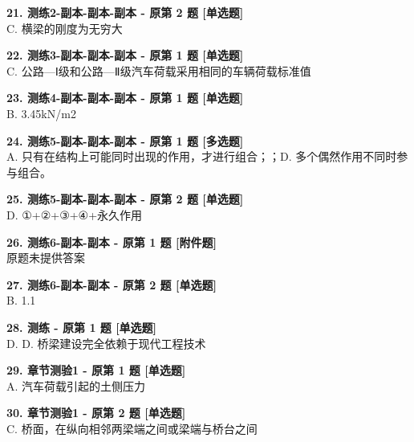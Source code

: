 \documentclass[UTF8,zihao=-4,openany]{ctexbook}
\begin{document}
\begin{answerline}
\textbf{21. 测练2-副本-副本-副本 - 原第 2 题 [单选题]}\\
C. 横梁的刚度为无穷大
\end{answerline}

\begin{answerline}
\textbf{22. 测练3-副本-副本-副本 - 原第 1 题 [单选题]}\\
C. 公路—Ⅰ级和公路—Ⅱ级汽车荷载采用相同的车辆荷载标准值
\end{answerline}

\begin{answerline}
\textbf{23. 测练4-副本-副本-副本 - 原第 1 题 [单选题]}\\
B. 3.45kN/m2
\end{answerline}

\begin{answerline}
\textbf{24. 测练5-副本-副本-副本 - 原第 1 题 [多选题]}\\
A. 只有在结构上可能同时出现的作用，才进行组合；；D. 多个偶然作用不同时参与组合。
\end{answerline}

\begin{answerline}
\textbf{25. 测练5-副本-副本-副本 - 原第 2 题 [单选题]}\\
D. ①+②+③+④+永久作用
\end{answerline}

\begin{answerline}
\textbf{26. 测练6-副本-副本 - 原第 1 题 [附件题]}\\
原题未提供答案
\end{answerline}

\begin{answerline}
\textbf{27. 测练6-副本-副本 - 原第 2 题 [单选题]}\\
B. 1.1
\end{answerline}

\begin{answerline}
\textbf{28. 测练 - 原第 1 题 [单选题]}\\
D. D. 桥梁建设完全依赖于现代工程技术
\end{answerline}

\begin{answerline}
\textbf{29. 章节测验1 - 原第 1 题 [单选题]}\\
A. 汽车荷载引起的土侧压力
\end{answerline}

\begin{answerline}
\textbf{30. 章节测验1 - 原第 2 题 [单选题]}\\
C. 桥面，在纵向相邻两梁端之间或梁端与桥台之间
\end{answerline}
\end{document}
